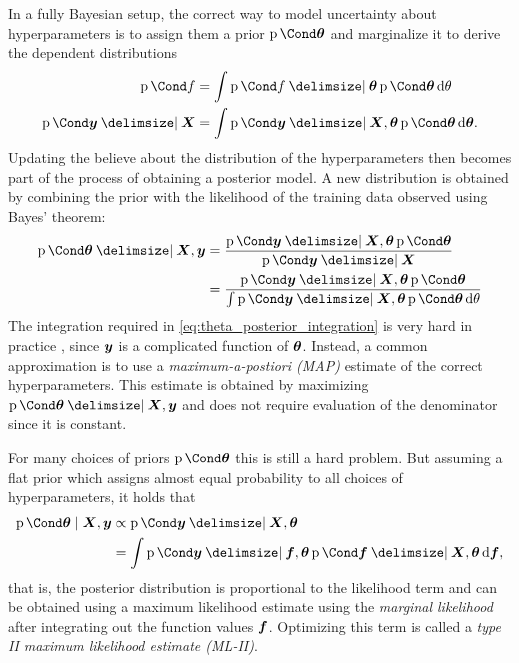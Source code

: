 In a fully Bayesian setup, the correct way to model uncertainty about hyperparameters is to assign them a prior $\Prob{\mat{\theta}}$ and marginalize it to derive the dependent distributions
\begin{align}
    \Prob{f} &= \int \Prob{f \given \mat{\theta}} \Prob{\mat{\theta}} \diff \theta \\
    \Prob{\mat{y} \given \mat{X}} &= \int \Prob{\mat{y} \given \mat{X}, \mat{\theta}} \Prob{\mat{\theta}} \diff \mat{\theta}. \label{eq:theta_posterior_integration}
\end{align}
Updating the believe about the distribution of the hyperparameters then becomes part of the process of obtaining a posterior model.
A new distribution is obtained by combining the prior with the likelihood of the training data observed using Bayes' theorem:
\begin{align}
    \Prob{\mat{\theta} \given \mat{X}, \mat{y}} &= \frac{\Prob{\mat{y} \given \mat{X}, \mat{\theta}} \Prob{\mat{\theta}}}{\Prob{\mat{y} \given \mat{X}}} \\ &= \frac{\Prob{\mat{y} \given \mat{X}, \mat{\theta}} \Prob{\mat{\theta}}}{\int \Prob{\mat{y} \given \mat{X}, \mat{\theta}} \Prob{\mat{\theta}} \diff \theta}
\end{align}
The integration required in \cref{eq:theta_posterior_integration} is very hard in practice \cite[109]{rasmussen_gaussian_2006}, since $\bm{y}$ is a complicated function of $\bm{\theta}$.
Instead, a common approximation is to use a \emph{maximum-a-postiori (MAP)} estimate of the correct hyperparameters.
This estimate is obtained by maximizing $\Prob{\mat{\theta} \given \mat{X}, \mat{y}}$ and does not require evaluation of the denominator since it is constant.

For many choices of priors $\Prob{\mat{\theta}}$ this is still a hard problem.
But assuming a flat prior which assigns almost equal probability to all choices of hyperparameters, it holds that
\begin{align}
    \Prob{\mat{\theta} \mid \mat{X}, \mat{y}} &\propto \Prob{\mat{y} \given \mat{X}, \mat{\theta}} \\
    &= \int \Prob{\mat{y} \given \mat{f}, \mat{\theta}} \Prob{\mat{f} \given \mat{X}, \mat{\theta}} \diff \mat{f},
\end{align}
that is, the posterior distribution is proportional to the likelihood term and can be obtained using a maximum likelihood estimate using the \emph{marginal likelihood} after integrating out the function values $\bm{f}$.
Optimizing this term is called a \emph{type II maximum likelihood estimate (ML-II)}.


